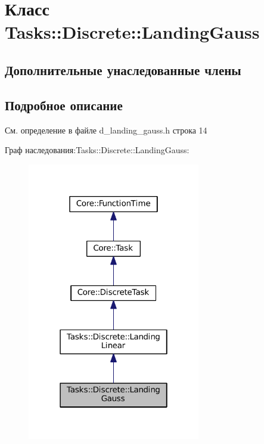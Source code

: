 \hypertarget{class_tasks_1_1_discrete_1_1_landing_gauss}{}\section{Класс Tasks\+:\+:Discrete\+:\+:Landing\+Gauss}
\label{class_tasks_1_1_discrete_1_1_landing_gauss}
\subsection*{Дополнительные унаследованные члены}


\subsection{Подробное описание}


См. определение в файле d\+\_\+landing\+\_\+gauss.\+h строка 14



Граф наследования\+:Tasks\+:\+:Discrete\+:\+:Landing\+Gauss\+:\nopagebreak
\begin{figure}[H]
\begin{center}
\leavevmode
\includegraphics[width=214pt]{class_tasks_1_1_discrete_1_1_landing_gauss__inherit__graph}
\end{center}
\end{figure}


